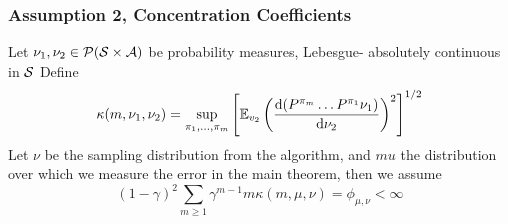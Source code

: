 \documentclass{beamer}
\begin{document}
\begin{frame}
	\frametitle{Assumption 2, Concentration Coefficients}
	Let $\nu_1, \nu_2 \in \mathcal{P}(\mathcal{S}\times \mathcal{A})$ be probability measures,
	Lebesgue- absolutely continuous in $\mathcal{S}$
	Define
	\[ \kappa(m, \nu_1, \nu_2) = \sup_{\pi_1, \dots, \pi_m}
		\left[ \mathbb{E}_{v_2} \left( \frac{\mathrm{d} (P^{\pi_m} \dots P^{\pi_1} \nu_1)}
		{\mathrm{d} \nu_2} \right)^2 \right]^{1/2} \]
	Let $\nu$ be the sampling distribution from the algorithm, and $mu$ the distribution
	over which we measure the error in the main theorem, then we assume
	\[ (1 - \gamma)^2 \sum_{m\geq 1} \gamma^{m-1} m \kappa(m, \mu, \nu)
		= \phi_{\mu, \nu} < \infty \]
\end{frame}
\end{document}
